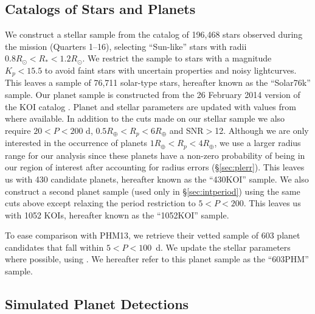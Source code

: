 \subsection{Catalogs of Stars and Planets}
\label{sec:catalogs}
We construct a stellar sample from the \cite{Huber2014} catalog of
196,468 stars observed during the \kep{} mission (Quarters 1--16),
selecting ``Sun-like'' stars with radii $0.8R_{\odot}<R_*<1.2R_{\odot}$. We
restrict the sample to stars with a \kep{} magnitude $K_{p}<15.5$ to
avoid faint stars with uncertain properties and noisy lightcurves.
This leaves a sample of 76,711 solar-type stars, hereafter known as
the ``Solar76k'' sample.  Our planet sample is constructed from the 26
February 2014 version of the KOI catalog \citep{Ramirez2014}.  Planet
and stellar parameters are updated with values from \cite{Huber2014}
where available.  In addition to the cuts made on our stellar sample
we also require $20<P<200$ d, $0.5R_{\oplus}<R_p<6R_{\oplus}$ and
SNR$>$12. Although we are only interested in the occurrence of planets 
$1R_{\oplus}<R_p<4R_{\oplus}$, we use a larger radius range for our analysis 
since these planets have a non-zero probability of being in our region of 
interest after accounting for radius errors (\S\ref{sec:plerr}).
This leaves us with 430 candidate planets, hereafter known
as the ``430KOI'' sample. We also construct a second planet sample
(used only in \S\ref{sec:intperiod}) using the same cuts above
except relaxing the period restriction to $5<P<200$.  This leaves us with
1052 KOIs, hereafter known as the ``1052KOI'' sample.

To ease comparison with PHM13, we retrieve their vetted sample of
603 planet candidates that fall within $5<P<100$~d. We update the stellar
parameters where possible, using \citet{Huber2014}.  We hereafter
refer to this planet sample as the ``603PHM'' sample.

\subsection{Simulated Planet Detections}
\label{sec:geneq}

